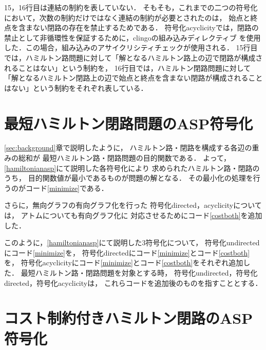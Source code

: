 15，16行目は連結の制約を表していない．
そもそも，これまでの二つの符号化において，次数の制約だけではなく連結の制約が必要とされたのは，
始点と終点を含まない閉路の存在を禁止するためである．
符号化acyclicityでは，閉路の禁止として非循環性を保証するために，clingoの組み込みディレクティブ\cite{gebser2016}
を使用した．この場合，組み込みのアサイクリシティチェック\cite{bomanson2016}が使用される．\cite{dimopoulos2018}
15行目では，ハミルトン路問題に対して「解となるハミルトン路上の辺で閉路が構成されることはない」という制約を，
16行目では，ハミルトン閉路問題に対して「解となるハミルトン閉路上の辺で始点と終点を含まない閉路が構成されることはない」という制約をそれぞれ表している．

\section{最短ハミルトン閉路問題のASP符号化}\label{minexpl}


\ref{sec:background}章で説明したように，
ハミルトン路・閉路を構成する各辺の重みの総和が
最短ハミルトン路・閉路問題の目的関数である．
よって，\ref{hamiltonianasp}にて説明した各符号化により
求められたハミルトン路・閉路のうち，
目的関数値が最小であるものが問題の解となる．
その最小化の処理を行うのがコード\ref{minimize}である．


さらに，無向グラフの有向グラフ化を行った
符号化directed，acyclicityについては，
アトムについても有向グラフ化に
対応させるためにコード\ref{costboth}を追加した．

このように，\ref{hamiltonianasp}にて説明した3符号化について，
符号化undirectedにコード\ref{minimize}を，
符号化directedにコード\ref{minimize}とコード\ref{costboth}を，
符号化acyclicityにコード\ref{minimize}とコード\ref{costboth}をそれぞれ追加した．
最短ハミルトン路・閉路問題を対象とする時，
符号化undirected，符号化directed，符号化acyclicityは，
これらコードを追加後のものを指すこととする．



\section{コスト制約付きハミルトン閉路のASP符号化}


